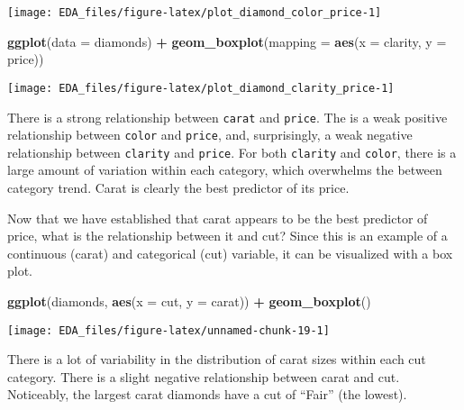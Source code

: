 \documentclass[]{book}
\newenvironment{Shaded}{\begin{snugshade}}{\end{snugshade}}
\newcommand{\DataTypeTok}[1]{\textcolor[rgb]{0.13,0.29,0.53}{#1}}
\newcommand{\KeywordTok}[1]{\textcolor[rgb]{0.13,0.29,0.53}{\textbf{#1}}}
\newcommand{\NormalTok}[1]{#1}
\newcommand{\OperatorTok}[1]{\textcolor[rgb]{0.81,0.36,0.00}{\textbf{#1}}}
\newcommand{\StringTok}[1]{\textcolor[rgb]{0.31,0.60,0.02}{#1}}
\theoremstyle{plain}
\theoremstyle{remark}
\theoremstyle{definition}
\theoremstyle{definition}
\theoremstyle{definition}
\theoremstyle{remark}
\begin{document}
\begin{center}\texttt{[image: EDA\_files/figure-latex/plot\_diamond\_color\_price-1]} \end{center}

\begin{Shaded}
\begin{Highlighting}[]
\KeywordTok{ggplot}\NormalTok{(}\DataTypeTok{data =}\NormalTok{ diamonds) }\OperatorTok{+}
\StringTok{  }\KeywordTok{geom_boxplot}\NormalTok{(}\DataTypeTok{mapping =} \KeywordTok{aes}\NormalTok{(}\DataTypeTok{x =}\NormalTok{ clarity, }\DataTypeTok{y =}\NormalTok{ price))}
\end{Highlighting}
\end{Shaded}

\begin{center}\texttt{[image: EDA\_files/figure-latex/plot\_diamond\_clarity\_price-1]} \end{center}

There is a strong relationship between \texttt{carat} and
\texttt{price}. The is a weak positive relationship between
\texttt{color} and \texttt{price}, and, surprisingly, a weak negative
relationship between \texttt{clarity} and \texttt{price}. For both
\texttt{clarity} and \texttt{color}, there is a large amount of
variation within each category, which overwhelms the between category
trend. Carat is clearly the best predictor of its price.

Now that we have established that carat appears to be the best predictor
of price, what is the relationship between it and cut? Since this is an
example of a continuous (carat) and categorical (cut) variable, it can
be visualized with a box plot.

\begin{Shaded}
\begin{Highlighting}[]
\KeywordTok{ggplot}\NormalTok{(diamonds, }\KeywordTok{aes}\NormalTok{(}\DataTypeTok{x =}\NormalTok{ cut, }\DataTypeTok{y =}\NormalTok{ carat)) }\OperatorTok{+}
\StringTok{  }\KeywordTok{geom_boxplot}\NormalTok{()}
\end{Highlighting}
\end{Shaded}

\begin{center}\texttt{[image: EDA\_files/figure-latex/unnamed-chunk-19-1]} \end{center}

There is a lot of variability in the distribution of carat sizes within
each cut category. There is a slight negative relationship between carat
and cut. Noticeably, the largest carat diamonds have a cut of ``Fair''
(the lowest).
\end{document}
